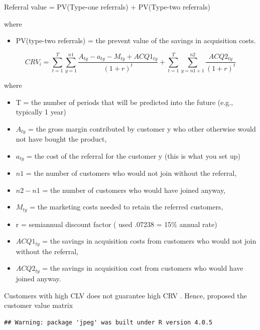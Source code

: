 \documentclass[
]{book}
\providecommand{\tightlist}{%
  \setlength{\itemsep}{0pt}\setlength{\parskip}{0pt}}
\begin{document}
Referral value = PV(Type-one referrals) + PV(Type-two referrals)

where

\begin{itemize}
\tightlist
\item
  PV(type-two referrals) = the prevent value of the savings in acquisition costs.
\end{itemize}

\[
CRV_i = \sum_{t =1}^{T} \sum_{y = 1}^{n1} \frac{A_{ty} - a_{ty} - M_{ty} + ACQ1_{ty}}{(1+r)^t} + \sum_{t=1}^{T} \sum_{y = n1+1}^{n2} \frac{ACQ2_{ty}}{(1+r)^t}
\]

where

\begin{itemize}
\tightlist
\item
  T = the number of periods that will be predicted into the future (e.g., typically 1 year)\\
\item
  \(A_{ty}\) = the gross margin contributed by customer y who other otherwise would not have bought the product,\\
\item
  \(a_{ty}\) = the cost of the referral for the customer y (this is what you set up)\\
\item
  \(n1\) = the number of customers who would not join without the referral,\\
\item
  \(n2-n1\) = the number of customers who would have joined anyway,\\
\item
  \(M_{ty}\) = the marketing costs needed to retain the referred customers,\\
\item
  r = semiannual discount factor (\citep{Kumar_2008} used .07238 = 15\% annual rate)\\
\item
  \(ACQ1_{ty}\) = the savings in acquisition costs from customers who would not join without the referral,\\
\item
  \(ACQ2_{ty}\) = the savings in acquisition cost from customers who would have joined anyway.
\end{itemize}

Customers with high CLV does not guarantee high CRV \citep{kumar_2007}. Hence, \citep{kumar_2007} proposed the customer value matrix

\begin{verbatim}
## Warning: package 'jpeg' was built under R version 4.0.5
\end{verbatim}
\end{document}
